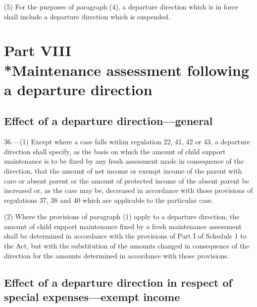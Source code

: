 \documentclass[12pt,a4paper]{article}
\begin{document}
(5) For the purposes of paragraph (4), a departure direction which is in force
shall include a departure direction which is suspended.


\section[Part VIII --- Maintenance assessment following a departure direction]{\sloppy Part VIII\\*Maintenance assessment following a departure direction}

\renewcommand\parthead{--- Part VIII}

\subsection[36. Effect of a
departure direction—general]{Effect of a
departure direction—general}

36.—(1) Except where a case falls within regulation
22, 41, 42 or 43, a departure direction shall specify, as the basis on which the
amount of child support maintenance is to be fixed by any fresh assessment made
in consequence of the direction, that the amount of net income or exempt income
of the parent with care or absent parent or the amount of protected income of
the absent parent be increased or, as the case may be, decreased in accordance
with those provisions of regulations 37, 38 and 40 which are applicable to the
particular case.

(2) Where the provisions of paragraph (1) apply to a departure direction, the
amount of child support maintenance fixed by a fresh maintenance assessment
shall be determined in accordance with the provisions of Part I of Schedule 1 to
the Act, but with the substitution of the amounts changed in consequence of the
direction for the amounts determined in accordance with those provisions.

\subsection[37. Effect of a departure direction in respect of special expenses—\hspace{0pt}exempt
income]{\sloppy Effect of a departure direction in respect of special expenses—\hspace{0pt}exempt
income}
\end{document}
